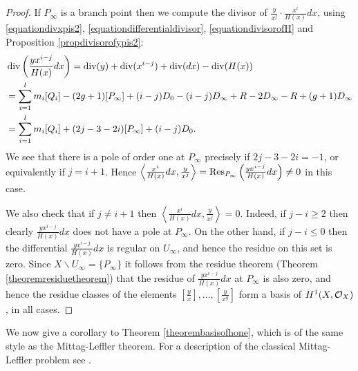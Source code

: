 \begin{proof}
    
    
    If $P_\infty$ is a branch point then we compute the divisor of $ \frac{y}{x^j} \cdot \frac{x^i}{H(x)}dx$, using \eqref{equationdivxpis2}, \eqref{equationdifferentialdivisor}, \eqref{equationdivisorofH} and Proposition \ref{propdivisorofypis2}:
        \begin{align*}
        &\operatorname{div}\left( \frac{yx^{i-j}}{H(x)}dx \right)  = \operatorname{div}(y) + \operatorname{div}(x^{i-j}) + \operatorname{div}( dx) - \operatorname{div}(H(x)) \\
        & = \sum_{i=1}^l m_i[Q_i] - (2g+ 1 )[P_\infty] + (i-j)D_0 - (i-j)D_\infty + R - 2D_\infty  - R + (g+1)D_\infty\\
        & = \sum_{i=1}^l m_i[Q_i] + (2j-3-2i)[P_\infty] + (i-j)D_0.
        \end{align*}
    We see that there is a pole of order one at $P_\infty$ precisely if $2j - 3 - 2i = -1$, or equivalently if $j = i+1$.
    Hence $\left\langle \frac{x^i}{H(x)}dx, \frac{y}{x^j} \right\rangle = \operatorname{Res}_{P_ \infty}\left( \frac{yx^{i-j}}{H(x)}dx\right)  \neq 0$ in this case.
    
    We also check that if $j \neq i+1$ then $\left \langle \frac{x^i}{H(x)}dx, \frac{y}{x^j} \right \rangle = 0$.
    Indeed, if $j-i \geq 2$ then clearly $\frac{yx^{i-j}}{H(x)}dx$ does not have a pole at $P_\infty$.
    On the other hand, if $j-i \leq 0$ then the differential $\frac{yx^{i-j}}{H(x)}dx$ is regular on $U_\infty$, and hence the residue on this set is zero.
    Since $X \backslash U_\infty = \{P_\infty\}$ it follows from the residue theorem (Theorem \ref{theoremresiduetheorem}) that the residue of $\frac{yx^{i-j}}{H(x)}dx$ at $P_\infty$ is also zero, and hence the residue classes of the elements $\left[\frac{y}{x}\right], \ldots, \left[\frac{y}{x^g}\right]$ form a basis of $H^1(X,\mathcal{O}_X)$, in all cases.
    \end{proof}


We now give a corollary to Theorem \ref{theorembasisofhone}, which is of the same style as the Mittag-Leffler theorem. For a description of the classical Mittag-Leffler problem see \cite[Pgs.\ 180-181]{miranda}.

